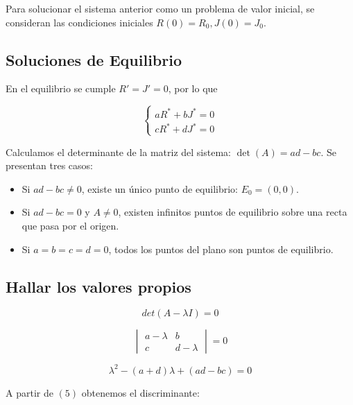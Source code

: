 \documentclass[10pt]{article}
\numberwithin{equation}{section}
\begin{document}
Para solucionar el sistema anterior como un problema de valor inicial, se consideran las condiciones iniciales $R(0)=R_0, J(0)=J_0$.
\subsection{Soluciones de Equilibrio}

En el equilibrio se cumple $R'=J'=0$, por lo que

\[
\begin{cases}
aR^*+bJ^*=0\\
cR^*+dJ^*=0
\end{cases}
\]

Calculamos el determinante de la matriz del sistema: $\det(A)=ad-bc$. Se presentan tres casos:

\begin{itemize}
    \item Si $ad-bc\neq 0$, existe un único punto de equilibrio: $E_0=(0,0)$.

    \item Si $ad-bc=0$ y $A\neq 0$, existen infinitos
    puntos de equilibrio sobre una recta que pasa por el origen.

    \item Si $a=b=c=d=0$, todos los puntos del plano son puntos de equilibrio.
\end{itemize}
\subsection{Hallar los valores propios}

\begin{equation}
det(A - \lambda I)= 0
\end{equation}

\begin{equation}
    \begin{vmatrix}
    a - \lambda & b\\
    c & d - \lambda
    \end{vmatrix} = 0
\end{equation}

\begin{equation}
\lambda^2-(a+d)\lambda+(ad-bc)=0
\end{equation}

A partir de $(5)$ obtenemos el discriminante:
\end{document}
